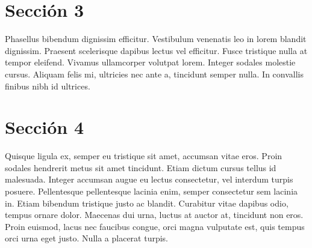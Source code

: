 	\section{Sección 3}
	
	Phasellus bibendum dignissim efficitur. Vestibulum venenatis leo in lorem blandit dignissim. Praesent scelerisque dapibus lectus vel efficitur. Fusce tristique nulla at tempor eleifend. Vivamus ullamcorper volutpat lorem. Integer sodales molestie cursus. Aliquam felis mi, ultricies nec ante a, tincidunt semper nulla. In convallis finibus nibh id ultrices.

	\section{Sección 4}
	Quisque ligula ex, semper eu tristique sit amet, accumsan vitae eros. Proin sodales hendrerit metus sit amet tincidunt. Etiam dictum cursus tellus id malesuada. Integer accumsan augue eu lectus consectetur, vel interdum turpis posuere. Pellentesque pellentesque lacinia enim, semper consectetur sem lacinia in. Etiam bibendum tristique justo ac blandit. Curabitur vitae dapibus odio, tempus ornare dolor. Maecenas dui urna, luctus at auctor at, tincidunt non eros. Proin euismod, lacus nec faucibus congue, orci magna vulputate est, quis tempus orci urna eget justo. Nulla a placerat turpis.
